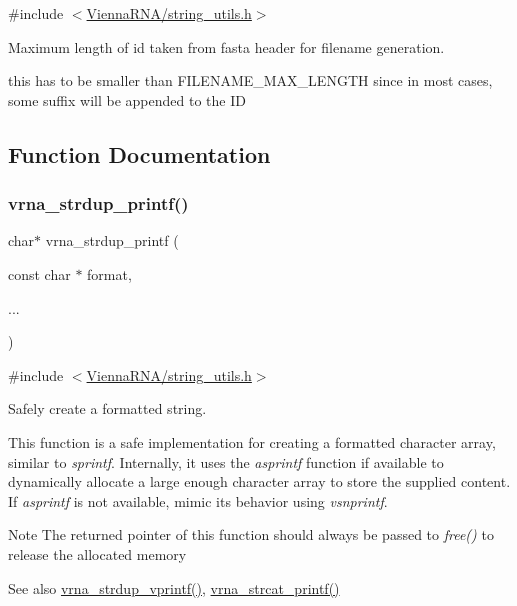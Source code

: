 {\ttfamily \#include $<$\hyperlink{string__utils_8h}{Vienna\+R\+N\+A/string\+\_\+utils.\+h}$>$}



Maximum length of id taken from fasta header for filename generation. 

this has to be smaller than F\+I\+L\+E\+N\+A\+M\+E\+\_\+\+M\+A\+X\+\_\+\+L\+E\+N\+G\+TH since in most cases, some suffix will be appended to the ID 

\subsection{Function Documentation}
\mbox{\label{group__string__utils_ga33cc0190a326ec368277caa777b8bf18}} 
\subsubsection{\texorpdfstring{vrna\+\_\+strdup\+\_\+printf()}{vrna\_strdup\_printf()}}
{\footnotesize\ttfamily char$\ast$ vrna\+\_\+strdup\+\_\+printf (\begin{DoxyParamCaption}\item[{const char $\ast$}]{format,  }\item[{}]{... }\end{DoxyParamCaption})}



{\ttfamily \#include $<$\hyperlink{string__utils_8h}{Vienna\+R\+N\+A/string\+\_\+utils.\+h}$>$}



Safely create a formatted string. 

This function is a safe implementation for creating a formatted character array, similar to {\itshape sprintf}. Internally, it uses the {\itshape asprintf} function if available to dynamically allocate a large enough character array to store the supplied content. If {\itshape asprintf} is not available, mimic it\textquotesingle{}s behavior using {\itshape vsnprintf}.

\begin{DoxyNote}{Note}
The returned pointer of this function should always be passed to {\itshape free()} to release the allocated memory
\end{DoxyNote}
\begin{DoxySeeAlso}{See also}
\hyperlink{group__string__utils_ga459fdee190ed81bb7773cbaf671748a9}{vrna\+\_\+strdup\+\_\+vprintf()}, \hyperlink{group__string__utils_gac0771ec71316023067f2aae61a5aa0fb}{vrna\+\_\+strcat\+\_\+printf()}
\end{DoxySeeAlso}

